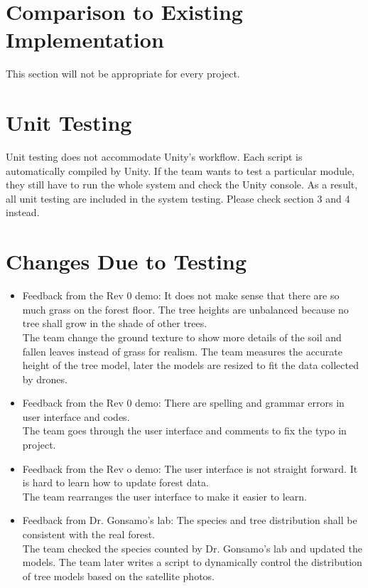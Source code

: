 \documentclass[12pt, titlepage]{article}
\begin{document}

\newpage
	
\section{Comparison to Existing Implementation}	
This section will not be appropriate for every project.

\section{Unit Testing}
Unit testing does not accommodate Unity's workflow. Each script is automatically compiled by Unity. If the team wants to test a particular module, they still have to run the whole system and check the Unity console. As a result, all unit testing are included in the system testing. Please check section 3 and 4 instead.

\section{Changes Due to Testing}
\begin{itemize}
    \item Feedback from the Rev 0 demo: It does not make sense that there are so much grass on the forest floor. The tree heights are unbalanced because no tree shall grow in the shade of other trees.\\
    The team change the ground texture to show more details of the soil and fallen leaves instead of grass for realism. The team measures the accurate height of the tree model, later the models are resized to fit the data collected by drones.
    \item Feedback from the Rev 0 demo: There are spelling and grammar errors in user interface and codes.\\
    The team goes through the user interface and comments to fix the typo in project.
    \item Feedback from the Rev o demo: The user interface is not straight forward. It is hard to learn how to update forest data.\\
    The team rearranges the user interface to make it easier to learn.
    \item Feedback from Dr. Gonsamo's lab: The species and tree distribution shall be consistent with the real forest.\\
    The team checked the species counted by Dr. Gonsamo's lab and updated the models. The team later writes a script to dynamically control the distribution of tree models based on the satellite photos.
\end{itemize}
\end{document}
